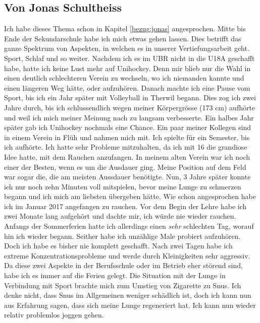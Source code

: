 \subsection{Von Jonas Schultheiss}
\authortoc{\jonas}{\subsectionident}
\label{vorher_jonas}
Ich habe dieses Thema schon in Kapitel \ref{bezug:jonas} angesprochen.
\newline
Mitte bis Ende der Sekundarschule habe ich mich etwas gehen lassen. Dies betrifft das ganze Spektrum von Aspekten, in welchen es in unserer Vertiefungsarbeit geht. Sport, Schlaf und so weiter. Nachdem ich es im \acs{UBR} nicht in die U18A geschafft habe, hatte ich keine Lust mehr auf Unihockey. Denn mir blieb nur die Wahl in einen deutlich schlechteren Verein zu wechseln, wo ich niemanden kannte und einen längeren Weg hätte, oder aufzuhören. Danach machte ich eine Pause vom Sport, bis ich ein Jahr später mit Volleyball in Therwil begann. Dies zog ich zwei Jahre durch, bis ich schlussendlich wegen meiner Körpergrösse (173 cm) aufhörte und weil ich mich meiner Meinung nach zu langsam verbesserte. Ein halbes Jahr später gab ich Unihockey nochmals eine Chance. Ein paar meiner Kollegen sind in einem Verein in Flüh und nahmen mich mit. Ich spielte für ein Semester, bis ich aufhörte. Ich hatte sehr Probleme mitzuhalten, da ich mit 16 die grandiose Idee hatte, mit dem Rauchen anzufangen. In meinem alten Verein war ich noch einer der Besten, wenn es um die Ausdauer ging. Meine Position auf dem Feld war sogar die, die am meisten Aussdauer benötigte. Nun, 3 Jahre später konnte ich nur noch zehn Minuten voll mitspielen, bevor meine Lunge zu schmerzen begann und ich mich am liebsten übergeben hätte.
\newline
Wie schon angesprochen habe ich im Januar 2017 angefangen zu rauchen. Vor dem Begin der Lehre habe ich zwei Monate lang aufgehört und dachte mir, ich würde nie wieder rauchen. Anfangs der Sommerferien hatte ich allerdings einen \textit{sehr} schlechten Tag, worauf hin ich wieder begann. Seither habe ich unzählige Male probiert aufzuhören. Doch ich habe es bisher nie komplett geschafft. Nach zwei Tagen habe ich extreme Konzentrationsprobleme und werde durch Kleinigkeiten sehr aggressiv. Da diese zwei Aspekte in der Berufsschule oder im Betrieb eher störend sind, habe ich es immer auf die Ferien gelegt. Die Situation mit der Lunge in Verbindung mit Sport brachte mich zum Umstieg von Zigarette zu Snus. Ich denke nicht, dass Snus im Allgemeinen weniger schädlich ist, doch ich kann nun aus Erfahrung sagen, dass sich meine Lunge regeneriert hat. Ich kann nun wieder relativ problemlos joggen gehen.
